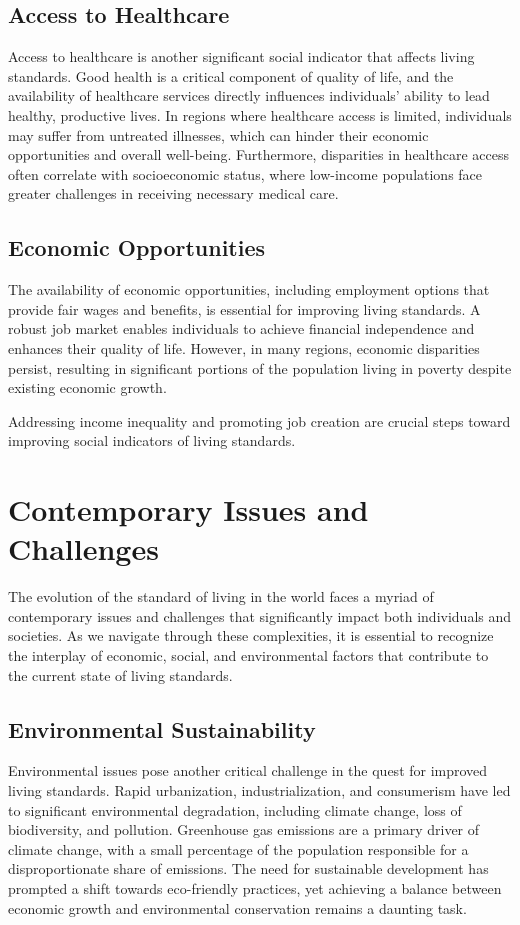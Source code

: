 \documentclass[12pt]{article}
\begin{document}
\subsection{Access to Healthcare}
Access to healthcare is another significant social indicator that affects living standards. Good health is a critical component of quality of life, and the availability of healthcare services directly influences individuals' ability to lead healthy, productive lives. In regions where healthcare access is limited, individuals may suffer from untreated illnesses, which can hinder their economic opportunities and overall well-being. Furthermore, disparities in healthcare access often correlate with socioeconomic
status, where low-income populations face greater challenges in receiving
necessary medical care.

\subsection{Economic Opportunities}
The availability of economic opportunities, including employment options that provide fair wages and benefits, is essential for improving living standards. A robust job market enables individuals to achieve financial independence and enhances their quality of life. However, in many regions, economic disparities persist, resulting in significant portions of the population living in poverty despite existing economic growth.

Addressing income inequality and promoting job creation are crucial steps toward improving social indicators of living standards.

\section{Contemporary Issues and Challenges}
The evolution of the standard of living in the world faces a myriad of contemporary
issues and challenges that significantly impact both individuals and societies. As
we navigate through these complexities, it is essential to recognize the interplay of
economic, social, and environmental factors that contribute to the current state of
living standards.

\subsection{Environmental Sustainability}
Environmental issues pose another critical challenge in the quest for improved
living standards. Rapid urbanization, industrialization, and consumerism have led to
significant environmental degradation, including climate change, loss of biodiversity,
and pollution. Greenhouse gas emissions are a primary driver of climate change,
with a small percentage of the population responsible for a disproportionate share
of emissions. The need for sustainable development has prompted a shift
towards eco-friendly practices, yet achieving a balance between economic growth
and environmental conservation remains a daunting task.
\end{document}
